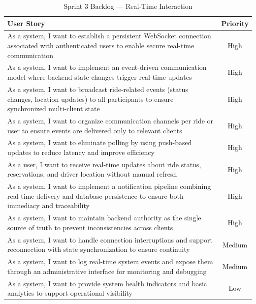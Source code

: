 \begin{table}[!htbp]
\centering
\renewcommand{\arraystretch}{1.2}
\setlength{\tabcolsep}{5pt}

\begin{tabular}{|p{}|c|}
\hline
\textbf{User Story} & \textbf{Priority} \\
\hline
As a system, I want to establish a persistent WebSocket connection associated with authenticated users to enable secure real-time communication & High \\
\hline
As a system, I want to implement an event-driven communication model where backend state changes trigger real-time updates & High \\
\hline
As a system, I want to broadcast ride-related events (status changes, location updates) to all participants to ensure synchronized multi-client state & High \\
\hline
As a system, I want to organize communication channels per ride or user to ensure events are delivered only to relevant clients & High \\
\hline
As a system, I want to eliminate polling by using push-based updates to reduce latency and improve efficiency & High \\
\hline
As a user, I want to receive real-time updates about ride status, reservations, and driver location without manual refresh & High \\
\hline
As a system, I want to implement a notification pipeline combining real-time delivery and database persistence to ensure both immediacy and traceability & High \\
\hline
As a system, I want to maintain backend authority as the single source of truth to prevent inconsistencies across clients & High \\
\hline
As a system, I want to handle connection interruptions and support reconnection with state synchronization to ensure continuity & Medium \\
\hline
As a system, I want to log real-time system events and expose them through an administrative interface for monitoring and debugging & Medium \\
\hline
As a system, I want to provide system health indicators and basic analytics to support operational visibility & Low \\
\hline
\end{tabular}

\caption{Sprint 3 Backlog — Real-Time Interaction}
\end{table}

